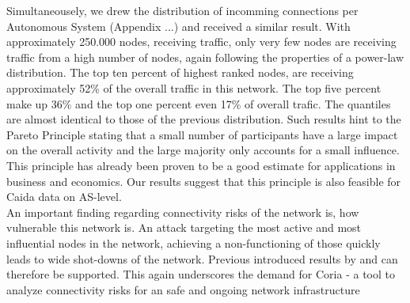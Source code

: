 \documentclass[conference, 11pt]{IEEEtran}
\begin{document}

Simultaneousely, we drew the distribution of incomming connections per Autonomous System (Appendix ...) and received a similar result. With approximately 250.000 nodes, receiving traffic, only very few nodes are receiving traffic from a high number of nodes, again following the properties of a power-law distribution. The top ten percent of highest ranked nodes, are receiving approximately 52\% of the overall traffic in this network. The top five percent make up 36\% and the top one percent even 17\% of overall trafic. The quantiles are almost identical to those of the previous distribution. Such results hint to the Pareto Principle stating that a small number of participants have a large impact on the overall activity and the large majority only accounts for a small influence. This principle has already been proven to be a good estimate for applications in business and economics. Our results suggest that this principle is also feasible for Caida data on AS-level.  \\ 



 


An important finding regarding connectivity risks of the network is, how vulnerable this network is. An attack targeting the most active and most influential nodes in the network, achieving a non-functioning of those quickly leads to wide shot-downs of the network. Previous introduced results by \cite{powerlawCitation} and \cite{owningInternet} can therefore be supported.  This again underscores the demand for Coria - a tool to analyze connectivity risks for an safe and ongoing network infrastructure 
\end{document}
